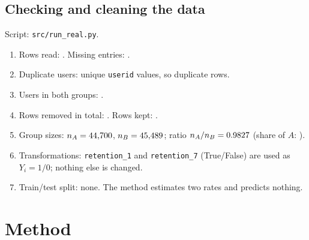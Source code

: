 \documentclass[11pt]{article}
\theoremstyle{definition}
\theoremstyle{remark}
\begin{document}
\subsection{Checking and cleaning the data}\label{sec:cleaning}
Script: \texttt{src/run\_real.py}.
\begin{enumerate}[nosep]
\item Rows read: \realRaw. Missing entries: \realMissing.
\item Duplicate users: \realUnique{} unique \texttt{userid} values, so \realDup{} duplicate rows.
\item Users in both groups: \realBoth.
\item Rows removed in total: \realRemoved. Rows kept: \realClean.
\item Group sizes: $n_A=44{,}700$, $n_B=45{,}489$; ratio $n_A/n_B=0.9827$ (share of $A$: \realShareA).
\item Transformations: \texttt{retention\_1} and \texttt{retention\_7} (True/False) are used as $Y_i=1/0$; nothing else is changed.
\item Train/test split: none. The method estimates two rates and predicts nothing.
\end{enumerate}

\section{Method}\label{sec:method}
\end{document}
